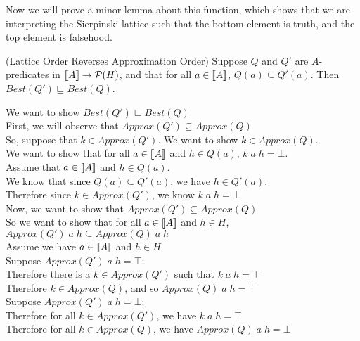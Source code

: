 Now we will prove a minor lemma about this function, which shows that we
are interpreting the Sierpinski lattice such that the bottom element
is truth, and the top element is falsehood.

\begin{lemma}{(Lattice Order Reverses Approximation Order)}
Suppose $Q$ and $Q'$ are $A$-predicates in $[\![{A}]\!] \to \mathcal{P}(H)$, and that
for all $a \in [\![{A}]\!]$, $Q(a) \subseteq Q'(a)$. Then $\mathit{Best}(Q') \sqsubseteq \mathit{Best}(Q)$. 
\end{lemma}

\begin{tabbedproof}
\oo We want to show $\mathit{Best}(Q') \sqsubseteq \mathit{Best}(Q)$ \\
\oo First, we will observe that $\mathit{Approx}(Q') \subseteq \mathit{Approx}(Q)$ \\
\oo So, suppose that $k \in \mathit{Approx}(Q')$. We want to show $k \in \mathit{Approx}(Q)$. \\
\ooo We want to show that for all $a \in [\![{A}]\!]$ and $h \in Q(a)$, $k\;a\;h = \bot$.  \\
\ooo Assume that $a \in [\![{A}]\!]$ and $h \in Q(a)$. \\ 
\oooo We know that since $Q(a) \subseteq Q'(a)$, we have $h \in Q'(a)$.  \\
\oooo Therefore since $k \in \mathit{Approx}(Q')$, we know $k\;a\;h = \bot$ \\
\oo Now, we want to show that $\mathit{Approx}(Q') \subseteq \mathit{Approx}(Q)$ \\
\oo So we want to show that for all $a \in [\![{A}]\!]$ and $h \in H$, $\mathit{Approx}(Q')\;a\;h \subseteq \mathit{Approx}(Q)\;a\;h$ \\
\oo Assume we have $a \in [\![{A}]\!]$ and $h \in H$ \\
\ooo Suppose $\mathit{Approx}(Q')\;a\;h = \top$: \\
\oooo Therefore there is a $k\in\mathit{Approx}(Q')$ such that $k\;a\;h = \top$ \\
\oooo Therefore $k \in \mathit{Approx}(Q)$, and so $\mathit{Approx}(Q)\;a\;h = \top$ \\
\ooo Suppose $\mathit{Approx}(Q')\;a\;h = \bot$: \\
\oooo Therefore for all $k \in \mathit{Approx}(Q')$, we have $k\;a\;h = \top$ \\
\oooo Therefore for all $k \in \mathit{Approx}(Q)$, we have $\mathit{Approx}(Q)\;a\;h = \bot$ \\

\end{tabbedproof}

